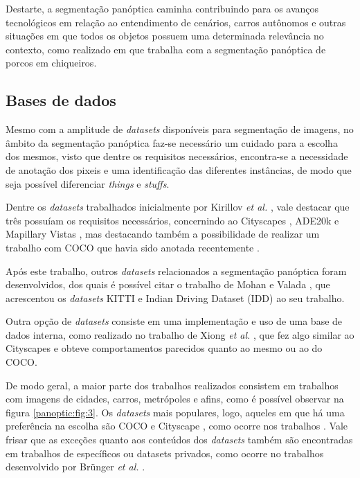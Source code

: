 Destarte, a segmentação panóptica caminha contribuindo para os avanços tecnológicos em relação ao entendimento de cenários, carros autônomos \cite{Liu2019} e outras situações em que todos os objetos possuem uma determinada relevância no contexto, como realizado em \cite{Brunger2020} que trabalha com a segmentação panóptica de porcos em chiqueiros.

\subsection{Bases de dados}
\label{panoptic:dataset}
Mesmo com a amplitude de \textit{datasets} disponíveis para segmentação de imagens, no âmbito da segmentação panóptica faz-se necessário um cuidado para a escolha dos mesmos, visto que dentre os requisitos necessários, encontra-se a necessidade de anotação dos pixeis e uma identificação das diferentes instâncias, de modo que seja possível diferenciar \textit{things} e \textit{stuffs}.

Dentre os \textit{datasets} trabalhados inicialmente por Kirillov \textit{et al.} \cite{Kirillov2019a}, vale destacar que três possuíam os requisitos necessários, concernindo ao Cityscapes \cite{Cordts2016}, ADE20k \cite{Zhou2016} e Mapillary Vistas \cite{Neuhold2017_ICCV}, mas destacando também a possibilidade de realizar um trabalho com COCO \cite{Lin2014} que havia sido anotada recentemente \cite{Kirillov2019a}.

Após este trabalho, outros \textit{datasets} relacionados a segmentação panóptica foram desenvolvidos, dos quais é possível citar o trabalho de Mohan e Valada \cite{Mohan2020}, que acrescentou os \textit{datasets} KITTI \cite{Geiger2013} e Indian Driving Dataset (IDD) \cite{Varma2018} ao seu trabalho.

Outra opção de \textit{datasets} consiste em uma implementação e uso de uma base de dados interna, como realizado no trabalho de Xiong \textit{et al.} \cite{Xiong2019}, que fez algo similar ao Cityscapes e obteve comportamentos parecidos quanto ao mesmo ou ao do COCO.

De modo geral, a maior parte dos trabalhos realizados consistem em trabalhos com imagens de cidades, carros, metrópoles e afins, como é possível observar na figura \ref{panoptic:fig:3}. Os \textit{datasets} mais populares, logo, aqueles em que há uma preferência na escolha são COCO \cite{Caesar2016, Lin2014} e Cityscape \cite{Cordts2016}, como ocorre nos trabalhos \cite{Chen2019, DeGeus2019a, DeGeus2019, Hou2019, Liu2019, Xiong2019}. Vale frisar que as exceções quanto aos conteúdos dos \textit{datasets} também são encontradas em trabalhos de específicos ou datasets privados, como ocorre no trabalhos desenvolvido por Brünger \textit{et al.} \cite{Brunger2020}.

